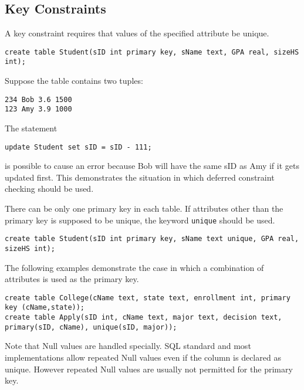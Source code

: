 \subsection{Key Constraints}
A key constraint requires that values of the specified attribute be unique.
\begin{lstlisting}
create table Student(sID int primary key, sName text, GPA real, sizeHS int);
\end{lstlisting}
Suppose the table contains two tuples:
\begin{lstlisting}
234 Bob 3.6 1500
123 Amy 3.9 1000
\end{lstlisting}
The statement
\begin{lstlisting}
update Student set sID = sID - 111;
\end{lstlisting}
is possible to cause an error because Bob will have the same sID as Amy if it gets updated first. This demonstrates the situation in which deferred constraint checking should be used.

There can be only one primary key in each table. If attributes other than the primary key is supposed to be unique, the keyword \texttt{unique} should be used.
\begin{lstlisting}
create table Student(sID int primary key, sName text unique, GPA real, sizeHS int);
\end{lstlisting}
The following examples demonstrate the case in which a combination of attributes is used as the primary key.
\begin{lstlisting}
create table College(cName text, state text, enrollment int, primary key (cName,state));
create table Apply(sID int, cName text, major text, decision text, primary(sID, cName), unique(sID, major));
\end{lstlisting}
Note that Null values are handled specially. SQL standard and most implementations allow repeated Null values even if the column is declared as unique. However repeated Null values are usually not permitted for the primary key.
\ifx\PREAMBLE\undefined

\fi